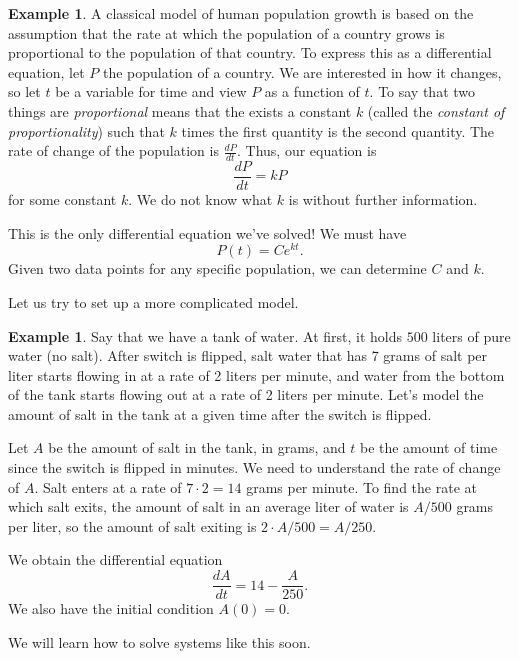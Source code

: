\documentclass[12pt]{amsart}
\numberwithin{equation}{section}
\theoremstyle{plain} %
\theoremstyle{definition}
\newtheorem{ex}[equation]{Example}
\theoremstyle{remark}
\begin{document}
\begin{ex} A classical model of human population growth is based on the assumption that the rate at which the population of a country grows is proportional to the population of that country. To express this as a differential equation, let $P$ the population of a country. We are interested in how it changes, so let $t$ be a variable for time and view $P$ as a function of $t$.  To say that two things are \emph{proportional} means that the exists a constant $k$ (called the \emph{constant of proportionality}) such that $k$ times the first quantity is the second quantity. The rate of change of the population is $\frac{dP}{dt}$. Thus, our equation is
\[ \frac{dP}{dt} = kP \]
for some constant $k$. We do not know what $k$ is without further information.

This is the only differential equation we've solved! We must have 
\[ P(t) = C e^{kt}.\]
Given two data points for any specific population, we can determine $C$ and $k$.
\end{ex}



Let us try to set up a more complicated model.

\begin{ex} Say that we have a tank of water. At first, it holds $500$ liters of pure water (no salt). After  switch is flipped, salt water that has 7 grams of salt per liter starts flowing in at a rate of 2 liters per minute, and water from the bottom of the tank starts flowing out at a rate of 2 liters per minute. 
Let's model the amount of salt in the tank at a given time after the switch is flipped.

Let $A$ be the amount of salt in the tank, in grams, and $t$ be the amount of time since the switch is flipped in minutes.
We need to understand the rate of change of $A$. Salt enters at a rate of $7 \cdot 2 = 14$ grams per minute. To find the rate at which salt exits, the amount of salt in an average liter of water is $A/500$ grams per liter, so the amount of salt exiting is $2 \cdot A/500 = A/250$.

We obtain the differential equation
\[ \frac{dA}{dt} = 14 - \frac{A}{250}.\]
We also have the initial condition $A(0)=0$.

We will learn how to solve systems like this soon.
\end{ex}
\end{document}
